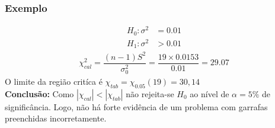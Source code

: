 \documentclass[14pt,aspectratio=1610]{beamer}
\newcommand{\Ho}{\ensuremath{H_{0}}}
\begin{document}
\begin{frame}{}
\frametitle{Exemplo}
\begin{block}{}
\justifying
\begin{align*}
H_{0}: \sigma^{2}&=0.01 \\ 
H_{1}: \sigma^{2}&>0.01
\end{align*}
\begin{align}
\chi^{2}_{cal}=\dfrac{(n-1)S^{2}}{\sigma_{0}^{2}}=\dfrac{19\times0.0153}{0.01}=29.07
\end{align}
O limite da região critíca é $\chi_{tab}=\chi_{0.05}(19)=30,14$\\
\textbf{Conclusão:} Como $|\chi_{cal}|<|\chi_{tab}|$ não rejeita-se $\Ho$ ao nível de $\alpha=5\%$ de significância. Logo, não há forte evidência de um problema com 
garrafas preenchidas incorretamente.
\end{block}
\end{frame}
\end{document}
